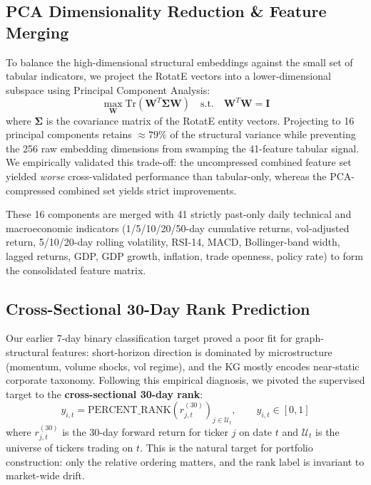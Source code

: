 \documentclass[10pt,journal,compsoc]{IEEEtran}
\begin{document}
\subsection{PCA Dimensionality Reduction \& Feature Merging}
To balance the high-dimensional structural embeddings against the small set of tabular indicators, we project the RotatE vectors into a lower-dimensional subspace using Principal Component Analysis:
\begin{equation}
\max_{\mathbf{W}} \text{Tr}(\mathbf{W}^T \mathbf{\Sigma} \mathbf{W}) \quad \text{s.t.} \quad \mathbf{W}^T \mathbf{W} = \mathbf{I}
\end{equation}
where $\mathbf{\Sigma}$ is the covariance matrix of the RotatE entity vectors. Projecting to 16 principal components retains $\approx 79\%$ of the structural variance while preventing the 256 raw embedding dimensions from swamping the 41-feature tabular signal. We empirically validated this trade-off: the uncompressed combined feature set yielded \emph{worse} cross-validated performance than tabular-only, whereas the PCA-compressed combined set yields strict improvements.

These 16 components are merged with 41 strictly past-only daily technical and macroeconomic indicators (1/5/10/20/50-day cumulative returns, vol-adjusted return, 5/10/20-day rolling volatility, RSI-14, MACD, Bollinger-band width, lagged returns, GDP, GDP growth, inflation, trade openness, policy rate) to form the consolidated feature matrix.

\subsection{Cross-Sectional 30-Day Rank Prediction}
Our earlier 7-day binary classification target proved a poor fit for graph-structural features: short-horizon direction is dominated by microstructure (momentum, volume shocks, vol regime), and the KG mostly encodes near-static corporate taxonomy. Following this empirical diagnosis, we pivoted the supervised target to the \textbf{cross-sectional 30-day rank}:
\begin{equation}
y_{i, t} = \text{PERCENT\_RANK}\!\left( r^{(30)}_{j, t} \right)_{j \in \mathcal{U}_t}, \qquad y_{i, t} \in [0, 1]
\end{equation}
where $r^{(30)}_{j, t}$ is the 30-day forward return for ticker $j$ on date $t$ and $\mathcal{U}_t$ is the universe of tickers trading on $t$. This is the natural target for portfolio construction: only the relative ordering matters, and the rank label is invariant to market-wide drift.
\end{document}
